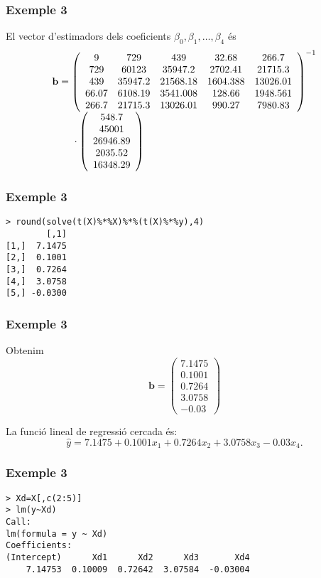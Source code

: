\documentclass[12pt,t]{beamer}
\theoremstyle{plain}
\theoremstyle{definition}
\begin{document}
\begin{frame}
\frametitle{Exemple 3}
El vector d'estimadors dels coeficients $\beta_0,\beta_1,\ldots,\beta_4$ és
{\small $$
\begin{array}{l}
\mathbf{b}=\left(
\begin{array}{ccccc}
9& 729& 439& 32.68 & 266.7 \\
729& 60123& 35947.2& 2702.41& 21715.3\\
439& 35947.2& 21568.18& 1604.388& 13026.01\\
66.07 & 6108.19 & 3541.008& 128.66& 1948.561\\
266.7& 21715.3&13026.01& 990.27& 7980.83
\end{array}
\right)^{-1}\\
\hphantom{\mathbf{b}=}\ \cdot 
\left(
\begin{array}{c}
548.7\\ 45001\\ 26946.89\\ 2035.52\\ 16348.29
\end{array}
\right)
\end{array}
$$
}
\end{frame}

\begin{frame}[fragile]
\frametitle{Exemple 3}
\begin{verbatim}
> round(solve(t(X)%*%X)%*%(t(X)%*%y),4)
        [,1]
[1,]  7.1475
[2,]  0.1001
[3,]  0.7264
[4,]  3.0758
[5,] -0.0300
\end{verbatim}

\end{frame}

\begin{frame}
\frametitle{Exemple 3}
Obtenim
$$
\mathbf{b}=\left(
\begin{array}{l}
7.1475 \\ 0.1001 \\ 0.7264 \\ 3.0758\\ -0.03
\end{array}
\right)
$$
\medskip

La funció lineal de regressió cercada és:
$$
\widehat{y}=7.1475 + 0.1001 x_1+0.7264 x_2 +3.0758 x_3-0.03 x_4.
$$
\end{frame}

\begin{frame}[fragile]
\frametitle{Exemple 3}
\small
\begin{verbatim}
> Xd=X[,c(2:5)]
> lm(y~Xd)
Call:
lm(formula = y ~ Xd)
Coefficients:
(Intercept)      Xd1      Xd2      Xd3       Xd4  
    7.14753  0.10009  0.72642  3.07584  -0.03004  
\end{verbatim}
\end{frame}
\end{document}
